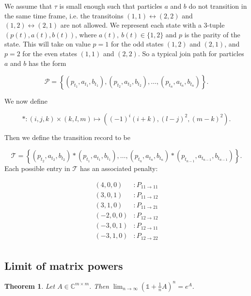 \documentclass{article}
\newcommand{\bC}{\mathbb{C}}
\newtheorem{theorem}{Theorem}[section]
\begin{document}
We assume that $\tau$ is small enough such that particles $a$ and $b$ do not transition in the same time frame, i.e. the transitoins
$(1,1) \leftrightarrow (2,2)$ and $(1,2) \leftrightarrow (2,1)$ are not allowed. We represent each state with a 3-tuple $(p(t), a(t), b(t))$, where $a(t), \: b(t) \in \{ 1, 2\}$ and $p$ is the parity of the state. This will take on value $p = 1 $ for the odd states $(1,2)$ and $(2,1)$, and $p=2$ for the even states $(1,1)$ and $(2,2)$. So a typical join path for particles $a$ and $b$ has the form

\begin{equation}\label{two_particle_path}
  \mathcal{P} = \left \{ (p_{t_1}, a_{t_1}, b_{t_1}), (p_{t_2}, a_{t_2}, b_{t_2}), \ldots, (p_{t_n}, a_{t_n}, b_{t_n}) \right \}.
\end{equation}

We now define

\begin{equation}
  \ast: (i,j,k) \times (k, l, m) \mapsto \left((-1)^i(i+k), (l-j)^2, (m-k)^2\right).
\end{equation}

Then we define the transition record to be

\begin{equation}
  \mathcal{T} = \left \{(p_{t_2}, a_{t_2}, b_{t_2}) \ast (p_{t_1}, a_{t_1}, b_{t_1}), \ldots, (p_{t_n}, a_{t_n}, b_{t_n}) \ast (p_{t_{n-1}}, a_{t_{n-1}}, b_{t_{n-1}}) \right \}.
\end{equation}
Each possible entry in $\mathcal{T}$ has an associated penalty:

\begin{align}
  (4,0,0) &: P_{11 \rightarrow 11} \\
  (3,0,1) &: P_{11 \rightarrow 12} \\
  (3,1,0) &: P_{11 \rightarrow 21} \\
  (-2,0,0) &: P_{12 \rightarrow 12} \\
  (-3,0,1) &: P_{12 \rightarrow 11} \\
  (-3,1,0) &: P_{12 \rightarrow 22} \\
\end{align}


\subsection*{Limit of matrix powers}
\begin{theorem}
Let $A \in \bC^{m\times m}$. Then $\lim_{n\rightarrow \infty}(\mathbb{1}+\frac{1}{n}A)^n = e^A$.
\end{theorem}
\end{document}
